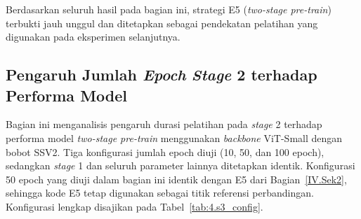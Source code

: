 Berdasarkan seluruh hasil pada bagian ini, strategi E5 (\textit{two-stage pre-train}) terbukti jauh unggul dan ditetapkan sebagai pendekatan pelatihan yang digunakan pada eksperimen selanjutnya.\par

\subsection{Pengaruh Jumlah \textit{Epoch} \textit{Stage} 2 terhadap Performa Model} \label{IV.Sek4}

Bagian ini menganalisis pengaruh durasi pelatihan pada \textit{stage} 2 terhadap performa model \textit{two-stage pre-train} menggunakan \textit{backbone} ViT-Small dengan bobot SSV2. Tiga konfigurasi jumlah epoch diuji (10, 50, dan 100 epoch), sedangkan \textit{stage} 1 dan seluruh parameter lainnya ditetapkan identik. Konfigurasi 50 epoch yang diuji dalam bagian ini identik dengan E5 dari Bagian~\ref{IV.Sek2}, sehingga kode E5 tetap digunakan sebagai titik referensi perbandingan. Konfigurasi lengkap disajikan pada Tabel~\ref{tab:4.s3_config}.\par

